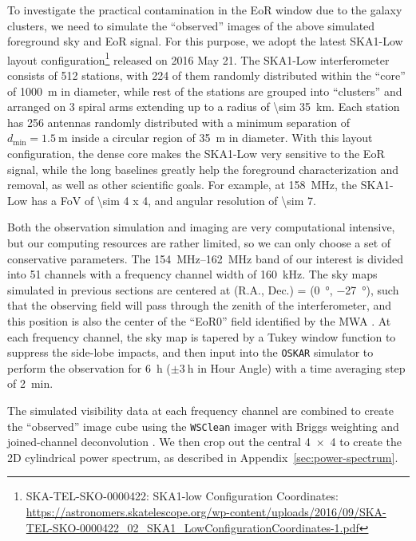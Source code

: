 \documentclass[modern]{aastex61}
\newcommand{\R}[1]{\mathrm{#1}}
\begin{document}
To investigate the practical contamination in the EoR window due to the
galaxy clusters, we need to simulate the \enquote{observed} images of
the above simulated foreground sky and EoR signal.
For this purpose,
we adopt the latest SKA1-Low layout configuration\footnote{%
  SKA-TEL-SKO-0000422: SKA1-low Configuration Coordinates: \url{https://astronomers.skatelescope.org/wp-content/uploads/2016/09/SKA-TEL-SKO-0000422_02_SKA1_LowConfigurationCoordinates-1.pdf}}
released on 2016 May 21.
The SKA1-Low interferometer consists of 512 stations, with 224 of them
randomly distributed within the \enquote{core} of \SI{1000}{\meter} in
diameter, while rest of the stations are grouped into \enquote{clusters}
and arranged on 3 spiral arms extending up to a radius of
\SI{\sim 35}{\kilo\meter}.
Each station has 256 antennas randomly distributed with a minimum separation
of $d_{\R{min}} = \SI{1.5}{\meter}$ inside a circular region of
\SI{35}{\meter} in diameter.
With this layout configuration, the dense core makes the SKA1-Low very
sensitive to the EoR signal, while the long baselines greatly help the
foreground characterization and removal, as well as other scientific goals.
For example, at \SI{158}{\MHz}, the SKA1-Low has a FoV of
\SI{\sim 4 x 4}{\deg}, and angular resolution of \SI{\sim 7}{\arcsec}.

Both the observation simulation and imaging are very computational
intensive, but our computing resources are rather limited, so we can
only choose a set of conservative parameters.
The \SIrange{154}{162}{\MHz} band of our interest is divided into 51
channels with a frequency channel width of \SI{160}{\kilo\hertz}.
The sky maps simulated in previous sections are centered at (R.A., Dec.)
= (\SI{0}{\degree}, \SI{-27}{\degree}), such that the observing field
will pass through the zenith of the interferometer, and this position
is also the center of the \enquote{EoR0} field identified by the MWA
\citep{beardsley2016}.
At each frequency channel, the sky map is tapered by a Tukey window
function to suppress the side-lobe impacts, and then input into the
\texttt{OSKAR} simulator \citep{mort2010} to perform the observation
for \SI{6}{\hour} ($\pm \SI{3}{\hour}$ in Hour Angle) with a time
averaging step of \SI{2}{\minute}.

The simulated visibility data at each frequency channel are combined
to create the \enquote{observed} image cube using the \texttt{WSClean}
imager \citep{offringa2014} with Briggs weighting and joined-channel
deconvolution \citep{offringa2017}.
We then crop out the central \SI{4 x 4}{\deg} to create the 2D cylindrical
power spectrum, as described in Appendix~\ref{sec:power-spectrum}.
\end{document}
